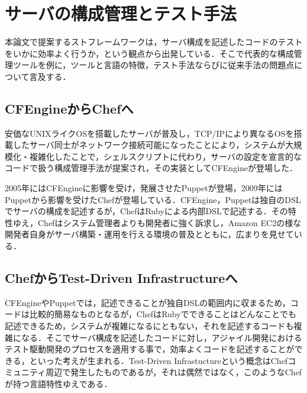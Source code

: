 \section{サーバの構成管理とテスト手法}

本論文で提案するストフレームワークは，サーバ構成を記述したコードのテストをいかに効率よく行うか，という観点から出発している．そこで代表的な構成管理ツールを例に，ツールと言語の特徴，テスト手法ならびに従来手法の問題点について言及する．

\subsection{CFEngineからChefへ}

安価なUNIXライクOSを搭載したサーバが普及し，TCP/IPにより異なるOSを搭載したサーバ同士がネットワーク接続可能になったことにより，システムが大規模化・複雑化したことで，シェルスクリプトに代わり，サーバの設定を宣言的なコードで扱う構成管理手法が提案され，その実装としてCFEngine\cite{cfengine}が登場した．

2005年にはCFEngineに影響を受け，発展させたPuppet\cite{puppet}が登場，2009年にはPuppetから影響を受けたChef\cite{chef}が登場している．CFEngine，Puppetは独自のDSLでサーバの構成を記述するが，ChefはRubyによる内部DSLで記述する．その特性ゆえ，Chefはシステム管理者よりも開発者に強く訴求し，Amazon EC2の様な開発者自身がサーバ構築・運用を行える環境の普及とともに，広まりを見せている．

\subsection{ChefからTest-Driven Infrastructureへ}

CFEngineやPuppetでは，記述できることが独自DSLの範囲内に収まるため，コードは比較的簡易なものとなるが，ChefはRubyでできることはどんなことでも記述できるため，システムが複雑になるにともない，それを記述するコードも複雑になる．そこでサーバ構成を記述したコードに対し，アジャイル開発におけるテスト駆動開発のプロセスを適用する事で，効率よくコードを記述することができる，といった考えが生まれる．Test-Driven Infrastuctureという概念はChefコミュニティ周辺で発生したものであるが，それは偶然ではなく，このようなChefが持つ言語特性ゆえである．

